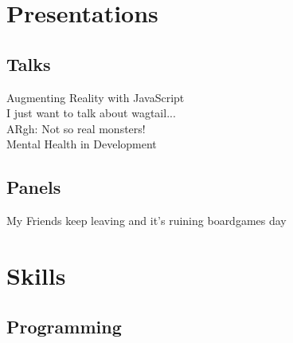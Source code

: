 \documentclass[a4paper]{deedy-resume} %
\begin{document}
\begin{minipage}[t]{0.33\textwidth}


\sectionspace %


\section{Presentations}

\subsection{Talks}
Augmenting Reality with JavaScript \\
I just want to talk about wagtail... \\
ARgh: Not so real monsters! \\
Mental Health in Development \\
\subsection{Panels}
My Friends keep leaving and it's ruining boardgames day \\

\sectionspace %


\section{Skills}

\subsection{Programming}


\end{minipage}
\end{document}
